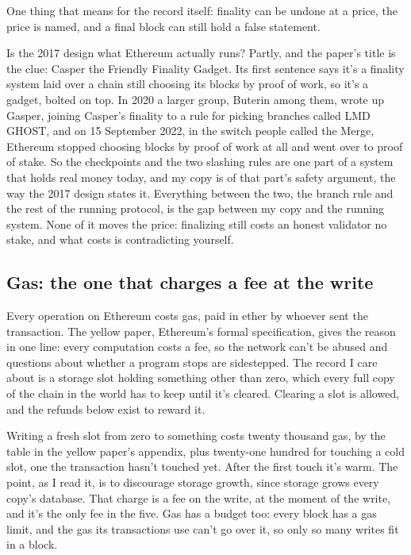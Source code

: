 \documentclass[11pt,twoside]{article}
\theoremstyle{thielethm}
\theoremstyle{thieledef}
\theoremstyle{thieledef}
\theoremstyle{thieledef}
\theoremstyle{thielethm}
\theoremstyle{thieleobs}
\theoremstyle{thielethm}
\begin{document}
One thing that means for the record itself: finality can be undone at a price, the price is named, and a final block can still hold a false statement.

Is the 2017 design what Ethereum actually runs? Partly, and the paper's title is the clue: Casper the Friendly Finality Gadget. Its first sentence says it's a finality system laid over a chain still choosing its blocks by proof of work, so it's a gadget, bolted on top. In 2020 a larger group, Buterin among them, wrote up Gasper, joining Casper's finality to a rule for picking branches called LMD GHOST, and on 15 September 2022, in the switch people called the Merge, Ethereum stopped choosing blocks by proof of work at all and went over to proof of stake. So the checkpoints and the two slashing rules are one part of a system that holds real money today, and my copy is of that part's safety argument, the way the 2017 design states it. Everything between the two, the branch rule and the rest of the running protocol, is the gap between my copy and the running system. None of it moves the price: finalizing still costs an honest validator no stake, and what costs is contradicting yourself.

\subsection{Gas: the one that charges a fee at the write}

Every operation on Ethereum costs gas, paid in ether by whoever sent the transaction. The yellow paper, Ethereum's formal specification, gives the reason in one line: every computation costs a fee, so the network can't be abused and questions about whether a program stops are sidestepped. The record I care about is a storage slot holding something other than zero, which every full copy of the chain in the world has to keep until it's cleared. Clearing a slot is allowed, and the refunds below exist to reward it.

Writing a fresh slot from zero to something costs twenty thousand gas, by the table in the yellow paper's appendix, plus twenty-one hundred for touching a cold slot, one the transaction hasn't touched yet. After the first touch it's warm. The point, as I read it, is to discourage storage growth, since storage grows every copy's database. That charge is a fee on the write, at the moment of the write, and it's the only fee in the five. Gas has a budget too: every block has a gas limit, and the gas its transactions use can't go over it, so only so many writes fit in a block.
\end{document}
